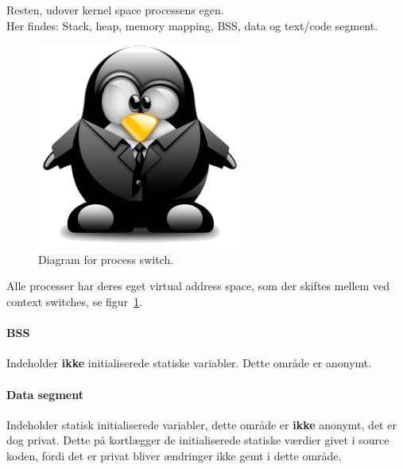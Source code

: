 Resten, udover kernel space processens egen.\\

Her findes: Stack, heap, memory mapping, BSS, data og text/code segment.

\begin{figure}[H]
	\centering
	\includegraphics[width=\linewidth]{figs/memoryspace}
	\caption{Diagram for process switch.}
	\label{fig:memoryspace}
\end{figure}

Alle processer har deres eget virtual address space, som der skiftes mellem ved context switches, se figur~\ref{fig:memoryspace}.

\paragraph{BSS}
Indeholder \textbf{ikke} initialiserede statiske variabler. Dette område er anonymt.

\paragraph{Data segment}
Indeholder statisk initialiserede variabler, dette område er \textbf{ikke} anonymt, det er dog privat. Dette på kortlægger de initialiserede statiske værdier givet i source koden, fordi det er privat bliver ændringer ikke gemt i dette område.\\

